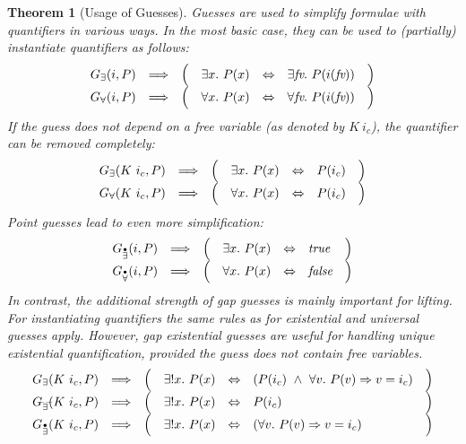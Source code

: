 \documentclass[a4paper,12pt,DIV=12,oneside]{scrbook}
\newcommand{\fv}{\textit{fv}}
\newtheorem{theorem}[lemma]{Theorem}
\theoremstyle{definition}
\theoremstyle{remark}
\newcommand{\GE}{\ensuremath{G_\exists}}
\newcommand{\GEP}{\ensuremath{G_{\accentset{\bullet}{\exists}}}}
\newcommand{\GEG}{\ensuremath{G_{\accentset{\_\,\_}{\exists}}}}
\newcommand{\GU}{\ensuremath{G_\forall}}
\newcommand{\GUP}{\ensuremath{G_{\accentset{\bullet}{\forall}}}}
\begin{document}
\begin{theorem}[Usage of Guesses]\label{lemma_guesses_usage}
Guesses are used to simplify formulae with quantifiers in various ways. In the most basic case, they can 
be used to (partially) instantiate quantifiers as follows:
\[%
\begin{array}[t]{cccrclc}
  \GE(i, P) & \Longrightarrow & \Big( & \exists x.\ P(x) & \Leftrightarrow & \exists \fv.\ P(i(\fv)) & \Big) \\ 
  \GU(i, P) & \Longrightarrow & \Big( & \forall x.\ P(x) & \Leftrightarrow & \forall \fv.\ P(i(\fv)) & \Big) \\ 
\end{array}
\]
%
If the guess does not depend on a free variable (as denoted by $K\ i_c$), the quantifier can be removed completely:
\[
\begin{array}[t]{cccrclc}
  \GE(K\ i_c, P) & \Longrightarrow & \Big( & \exists x.\ P(x) & \Leftrightarrow & P(i_c) & \Big) \\ 
  \GU(K\ i_c, P) & \Longrightarrow & \Big( & \forall x.\ P(x) & \Leftrightarrow & P(i_c) & \Big) \\ 
\end{array}
\]
Point guesses lead to even more simplification:
\[
\begin{array}[t]{cccrclc}
  \GEP(i, P) & \Longrightarrow & \Big( & \exists x.\ P(x) & \Leftrightarrow & \textit{true} & \Big) \\ 
  \GUP(i, P) & \Longrightarrow & \Big( & \forall x.\ P(x) & \Leftrightarrow & \textit{false} & \Big) \\ 
\end{array}
\]
In contrast, the additional strength of gap guesses 
is mainly important for lifting. For instantiating quantifiers the same rules as for
existential and universal guesses apply.
However, gap existential guesses are useful for handling unique existential quantification, provided
the guess does not contain free variables.
\[
\begin{array}[t]{cccrclc}
  \GE(K\ i_c, P) & \Longrightarrow & \Big( & \exists! x.\ P(x) & \Leftrightarrow & 
    (P(i_c)\ \wedge\ \forall v.\ P(v) \Rightarrow v = i_c) & \Big) \\ 
  \GEG(K\ i_c, P) & \Longrightarrow & \Big( & \exists! x.\ P(x) & \Leftrightarrow & 
    P(i_c) & \Big) \\ 
  \GEP(K\ i_c, P) & \Longrightarrow & \Big( & \exists! x.\ P(x) & \Leftrightarrow & 
    (\forall v.\ P(v) \Rightarrow v = i_c) & \Big) 
\end{array}
\]
\end{theorem}
\end{document}
